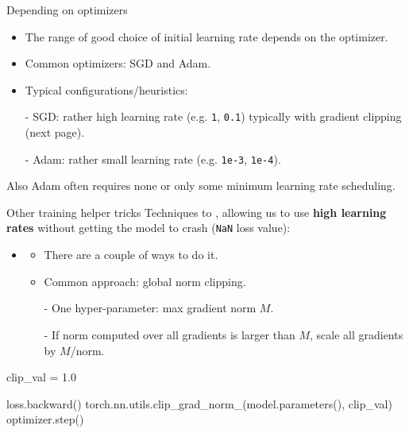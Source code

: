 \begin{frame}{Depending on optimizers}
\begin{itemize}
\item The range of good choice of initial learning rate depends on the optimizer.
\item Common optimizers: SGD and Adam.
\item Typical configurations/heuristics:
\item[-] SGD: rather high learning rate (e.g. \texttt{1}, \texttt{0.1}) typically with gradient clipping (next page).
\item[-] Adam: rather small learning rate (e.g. \texttt{1e-3}, \texttt{1e-4}).
\end{itemize}
Also Adam often requires none or only some minimum learning rate scheduling.
\end{frame}


\begin{frame}[fragile]{Other training helper tricks}
Techniques to , allowing us to use \textbf{high learning rates} without getting the model to crash (\texttt{NaN} loss value):
\vsp
\begin{itemize}
\item {}
\begin{itemize}
\item There are a couple of ways to do it.
\item Common approach: global norm clipping.
\item[-] One hyper-parameter: max gradient norm $M$.
\item[-] If norm computed over all gradients is larger than $M$, scale all gradients by $M$/norm.
\end{itemize}
\end{itemize}
\begin{python}
clip_val = 1.0

loss.backward()
torch.nn.utils.clip_grad_norm_(model.parameters(), clip_val)
optimizer.step()
\end{python}
\end{frame}

